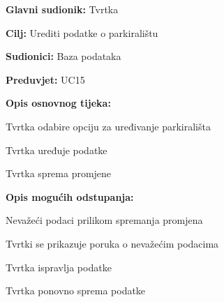 \noindent {}
\begin{packed_item}
	
	\item \textbf{Glavni sudionik:} Tvrtka
	\item \textbf{Cilj:} Urediti podatke o parkiralištu
	\item \textbf{Sudionici:} Baza podataka
	\item \textbf{Preduvjet:} UC15
	\item \textbf{Opis osnovnog tijeka:}
	
	\item[] \begin{packed_enum}
		
		\item Tvrtka odabire opciju za uređivanje parkirališta
		\item Tvrtka uređuje podatke
		\item Tvrtka sprema promjene
	
	\end{packed_enum}
	
	\item  \textbf{Opis mogućih odstupanja:}
	
	\item[] \begin{packed_item}
		
		\item[2.a] Nevažeći podaci prilikom spremanja promjena
		\item[] \begin{packed_enum}
			
			\item Tvrtki se prikazuje poruka o nevažećim podacima
			\item Tvrtka ispravlja podatke
			\item Tvrtka ponovno sprema podatke
			
		\end{packed_enum}
		
	\end{packed_item}

\end{packed_item}

